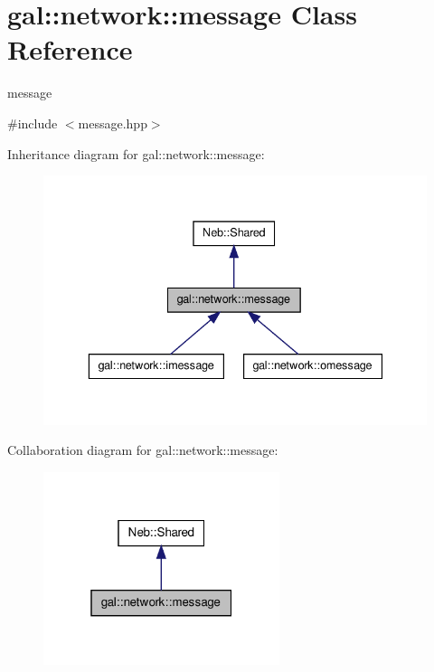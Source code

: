 \hypertarget{classgal_1_1network_1_1message}{\section{gal\-:\-:network\-:\-:message \-Class \-Reference}
\label{classgal_1_1network_1_1message}
}


message  




{\ttfamily \#include $<$message.\-hpp$>$}



\-Inheritance diagram for gal\-:\-:network\-:\-:message\-:
\nopagebreak
\begin{figure}[H]
\begin{center}
\leavevmode
\includegraphics[width=336pt]{classgal_1_1network_1_1message__inherit__graph}
\end{center}
\end{figure}


\-Collaboration diagram for gal\-:\-:network\-:\-:message\-:
\nopagebreak
\begin{figure}[H]
\begin{center}
\leavevmode
\includegraphics[width=196pt]{classgal_1_1network_1_1message__coll__graph}
\end{center}
\end{figure}
